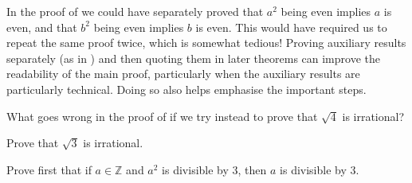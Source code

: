 \begin{writingtip}
In the proof of  we could have separately proved that $a^2$ being even implies $a$ is even, and that $b^2$ being even implies $b$ is even. This would have required us to repeat the same proof twice, which is somewhat tedious! Proving auxiliary results separately (as in ) and then quoting them in later theorems can improve the readability of the main proof, particularly when the auxiliary results are particularly technical. Doing so also helps emphasise the important steps.
\end{writingtip}

\begin{exercise}
What goes wrong in the proof of  if we try instead to prove that $\sqrt{4}$ is irrational?
\end{exercise}

\begin{exercise}
\label{exSquareRootThreeIsIrrational}
Prove that $\sqrt{3}$ is irrational.
\begin{backhint}
Prove first that if $a \in \mathbb{Z}$ and $a^2$ is divisible by $3$, then $a$ is divisible by $3$.
\end{backhint}
\end{exercise}


